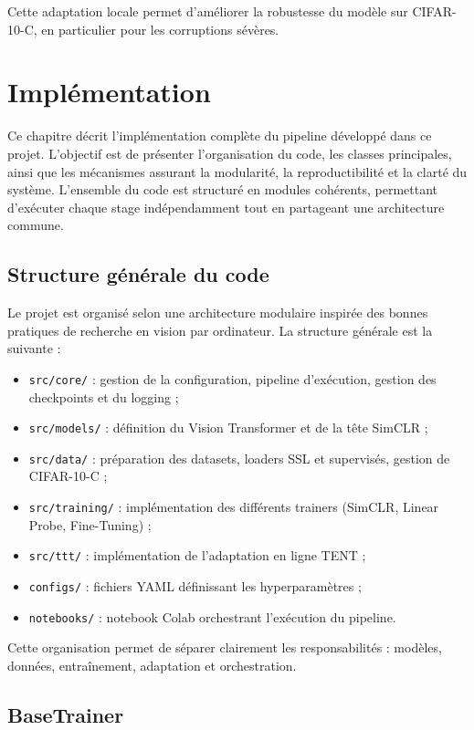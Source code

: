 \documentclass[12pt,a4paper]{report}
\begin{document}
	Cette adaptation locale permet d’améliorer la robustesse du modèle sur CIFAR-10-C, en particulier pour les corruptions sévères.
	\chapter{Implémentation}
	
	Ce chapitre décrit l’implémentation complète du pipeline développé dans ce projet. L’objectif est de présenter l’organisation du code, les classes principales, ainsi que les mécanismes assurant la modularité, la reproductibilité et la clarté du système. L’ensemble du code est structuré en modules cohérents, permettant d’exécuter chaque stage indépendamment tout en partageant une architecture commune.
	
	\section{Structure générale du code}
	
	Le projet est organisé selon une architecture modulaire inspirée des bonnes pratiques de recherche en vision par ordinateur. La structure générale est la suivante :
	
	\begin{itemize}
		\item \texttt{src/core/} : gestion de la configuration, pipeline d’exécution, gestion des checkpoints et du logging ;
		\item \texttt{src/models/} : définition du Vision Transformer et de la tête SimCLR ;
		\item \texttt{src/data/} : préparation des datasets, loaders SSL et supervisés, gestion de CIFAR-10-C ;
		\item \texttt{src/training/} : implémentation des différents trainers (SimCLR, Linear Probe, Fine-Tuning) ;
		\item \texttt{src/ttt/} : implémentation de l’adaptation en ligne TENT ;
		\item \texttt{configs/} : fichiers YAML définissant les hyperparamètres ;
		\item \texttt{notebooks/} : notebook Colab orchestrant l’exécution du pipeline.
	\end{itemize}
	
	Cette organisation permet de séparer clairement les responsabilités : modèles, données, entraînement, adaptation et orchestration.
	
	\section{BaseTrainer}
	
\end{document}
